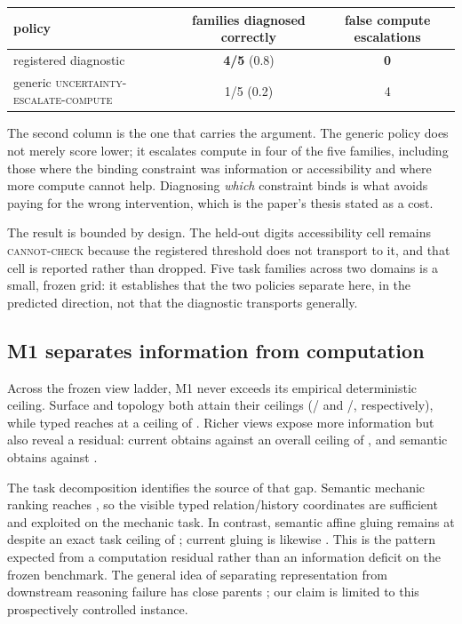 \begin{center}
\begin{tabular}{lcc}
\hline
policy & families diagnosed correctly & false compute escalations \\
\hline
registered diagnostic & \textbf{4/5} (0.8) & \textbf{0} \\
generic \textsc{uncertainty-escalate-compute} & 1/5 (0.2) & 4 \\
\hline
\end{tabular}
\end{center}

The second column is the one that carries the argument. The generic policy does
not merely score lower; it escalates compute in four of the five families,
including those where the binding constraint was information or accessibility and
where more compute cannot help. Diagnosing \emph{which} constraint binds is what
avoids paying for the wrong intervention, which is the paper's thesis stated as a
cost.

The result is bounded by design. The held-out digits accessibility cell remains
\textsc{cannot-check} because the registered threshold does not transport to it, and
that cell is reported rather than dropped. Five task families across two domains
is a small, frozen grid: it establishes that the two policies separate here, in
the predicted direction, not that the diagnostic transports generally.

\subsection{M1 separates information from computation}

Across the frozen view ladder, M1 never exceeds its empirical deterministic ceiling. Surface and topology both attain their ceilings (\MOneSurfaceAccuracy/\MOneSurfaceCeiling{} and \MOneTopologyAccuracy/\MOneTopologyCeiling{}, respectively), while typed reaches \MOneTypedAccuracy{} at a ceiling of \MOneTypedCeiling{}. Richer views expose more information but also reveal a residual: current obtains \MOneCurrentAccuracy{} against an overall ceiling of \MOneCurrentCeiling{}, and semantic obtains \MOneSemanticAccuracy{} against \MOneSemanticCeiling{}.

The task decomposition identifies the source of that gap. Semantic mechanic ranking reaches \MOneSemanticMechanicAccuracy{}, so the visible typed relation/history coordinates are sufficient and exploited on the mechanic task. In contrast, semantic affine gluing remains at \MOneSemanticGluingAccuracy{} despite an exact task ceiling of \MOneSemanticGluingCeiling{}; current gluing is likewise \MOneCurrentGluingAccuracy{}. This is the pattern expected from a computation residual rather than an information deficit on the frozen benchmark. The general idea of separating representation from downstream reasoning failure has close parents \citep{liem2026temporal,anonymous2026chokepoints}; our claim is limited to this prospectively controlled instance.

